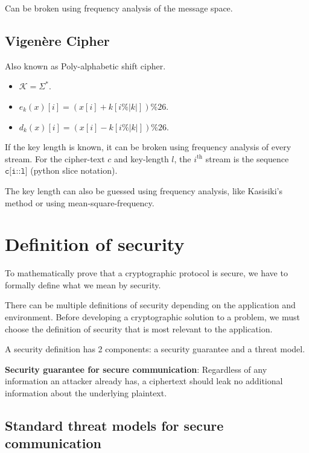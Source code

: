 Can be broken using frequency analysis of the message space.

\subsection{Vigen\`ere Cipher}

Also known as Poly-alphabetic shift cipher.

\begin{itemize}
\item $\mathcal{K} = \Sigma^*$.
\item $e_k(x)[i] = (x[i] + k[i\%|k|])\%26$.
\item $d_k(x)[i] = (x[i] - k[i\%|k|])\%26$.
\end{itemize}

If the key length is known, it can be broken using frequency analysis of every stream.
For the cipher-text $c$ and key-length $l$, the $i^{\textrm{th}}$ stream is the sequence
$\texttt{c[i::l]}$ (python slice notation).

The key length can also be guessed using frequency analysis,
like Kasisiki's method or using mean-square-frequency.

\section{Definition of security}

To mathematically prove that a cryptographic protocol is secure,
we have to formally define what we mean by security.

There can be multiple definitions of security depending on the application and environment.
Before developing a cryptographic solution to a problem, we must
choose the definition of security that is most relevant to the application.

A security definition has 2 components: a security guarantee and a threat model.

\textbf{Security guarantee for secure communication}:
Regardless of any information an attacker already has,
a ciphertext should leak no additional information about the underlying plaintext.

\subsection{Standard threat models for secure communication}

